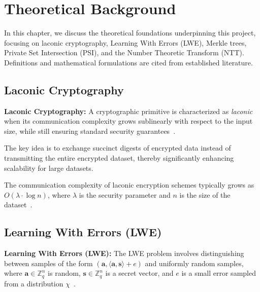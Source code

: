 \chapter{Theoretical Background}

In this chapter, we discuss the theoretical foundations underpinning this project, focusing on laconic cryptography, Learning With Errors (LWE), Merkle trees, Private Set Intersection (PSI), and the Number Theoretic Transform (NTT). Definitions and mathematical formulations are cited from established literature.

\section{Laconic Cryptography}

\begin{definition}\label{def:laconic}
\textbf{Laconic Cryptography:} A cryptographic primitive is characterized as \textit{laconic} when its communication complexity grows sublinearly with respect to the input size, while still ensuring standard security guarantees~\cite{dottling2023efficient}.
\end{definition}

The key idea is to exchange succinct digests of encrypted data instead of transmitting the entire encrypted dataset, thereby significantly enhancing scalability for large datasets.

\begin{remark}
The communication complexity of laconic encryption schemes typically grows as $O(\lambda \cdot \log n)$, where $\lambda$ is the security parameter and $n$ is the size of the dataset~\cite{dottling2023efficient}.
\end{remark}

\section{Learning With Errors (LWE)}

\begin{definition}\label{def:lwe}
\textbf{Learning With Errors (LWE):} The LWE problem involves distinguishing between samples of the form $(\mathbf{a}, \langle \mathbf{a}, \mathbf{s} \rangle + e)$ and uniformly random samples, where $\mathbf{a} \in \mathbb{Z}_q^n$ is random, $\mathbf{s} \in \mathbb{Z}_q^n$ is a secret vector, and $e$ is a small error sampled from a distribution $\chi$~\cite{regev2005lattices}.
\end{definition}

